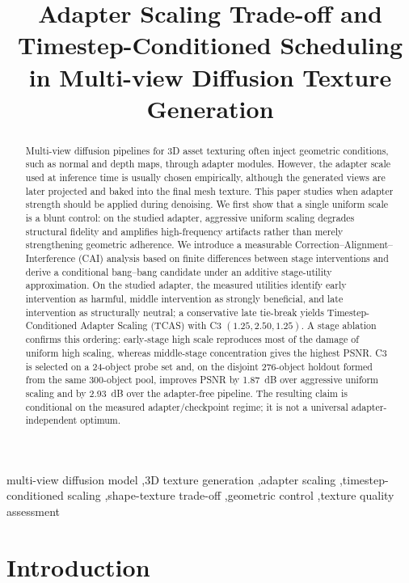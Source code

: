 \documentclass[times,twocolumn,final]{elsarticle}
\begin{document}
\begin{frontmatter}

\title{Adapter Scaling Trade-off and Timestep-Conditioned Scheduling in Multi-view Diffusion Texture Generation}

\author{}

\begin{abstract}
Multi-view diffusion pipelines for 3D asset texturing often inject geometric conditions, such as normal and depth maps, through adapter modules. However, the adapter scale used at inference time is usually chosen empirically, although the generated views are later projected and baked into the final mesh texture. This paper studies when adapter strength should be applied during denoising. We first show that a single uniform scale is a blunt control: on the studied adapter, aggressive uniform scaling degrades structural fidelity and amplifies high-frequency artifacts rather than merely strengthening geometric adherence. We introduce a measurable Correction--Alignment--Interference (CAI) analysis based on finite differences between stage interventions and derive a conditional bang--bang candidate under an additive stage-utility approximation. On the studied adapter, the measured utilities identify early intervention as harmful, middle intervention as strongly beneficial, and late intervention as structurally neutral; a conservative late tie-break yields Timestep-Conditioned Adapter Scaling (TCAS) with C3 $(1.25, 2.50, 1.25)$. A stage ablation confirms this ordering: early-stage high scale reproduces most of the damage of uniform high scaling, whereas middle-stage concentration gives the highest PSNR. C3 is selected on a 24-object probe set and, on the disjoint 276-object holdout formed from the same 300-object pool, improves PSNR by 1.87~dB over aggressive uniform scaling and by 2.93~dB over the adapter-free pipeline. The resulting claim is conditional on the measured adapter/checkpoint regime; it is not a universal adapter-independent optimum.
\end{abstract}

\begin{keyword}
\KWD
multi-view diffusion model \sep 3D texture generation \sep adapter scaling \sep timestep-conditioned scaling \sep shape-texture trade-off \sep geometric control \sep texture quality assessment
\end{keyword}

\end{frontmatter}

\section{Introduction}
\label{sec:intro}
\end{document}
